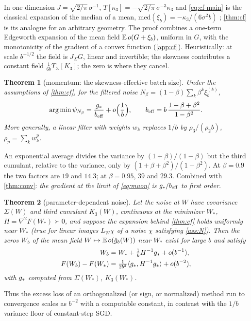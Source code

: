 \documentclass{article}
\theoremstyle{plain}
\newtheorem{theorem}{Theorem}
\theoremstyle{definition}
\theoremstyle{remark}
\begin{document}
In one dimension $J=\sqrt{2/\pi}\,\sigma^{-1}$, $T[\kappa_3]=-\sqrt{2/\pi}\,\sigma^{-3}\kappa_3$ and
\eqref{eq:cf-main} is the classical expansion of the median of a mean, $\mathrm{med}(\xi_b)=-\kappa_3/(6\sigma^2b)$
\citep{cornish1938moments}; \cref{thm:cf} is its analogue for an arbitrary geometry. The proof combines a one-term
Edgeworth expansion of the mean field $\mathbb{E}\,o(G+\xi_b)$, uniform in $G$, with the monotonicity of the gradient of a
convex function (\cref{app:cf}). Heuristically: at scale $b^{-1/2}$ the field is $J_\Sigma G$, linear and
invertible; the skewness contributes a constant field $\frac1{6b}T_\Sigma[K_3]$; the zero is where they cancel.

\begin{theorem}[momentum: the skewness-effective batch size]\label{thm:beff}
Under the assumptions of \cref{thm:cf}, for the filtered noise $N_\beta=(1-\beta)\sum_k\beta^k\xi_b^{(k)}$,
\[
\arg\min\psi_{N_\beta}=\frac{g_\ast}{b_{\mathrm{eff}}}+o\Big(\frac1b\Big),\qquad b_{\mathrm{eff}}=b\,\frac{1+\beta+\beta^2}{1-\beta^2}.
\]
More generally, a linear filter with weights $w_k$ replaces $1/b$ by $\rho_3/(\rho_2b)$, $\rho_p=\sum_kw_k^p$.
\end{theorem}

An exponential average divides the variance by $(1+\beta)/(1-\beta)$ but the third cumulant, relative to the
variance, only by $(1+\beta+\beta^2)/(1-\beta^2)$. At $\beta=0.9$ the two factors are $19$ and $14.3$; at
$\beta=0.95$, $39$ and $29.3$. Combined with \cref{thm:conv}: \emph{the gradient at the limit of \eqref{eq:muon} is
$g_\ast/b_{\mathrm{eff}}$ to first order.}

\begin{theorem}[parameter-dependent noise]\label{thm:state}
Let the noise at $W$ have covariance $\Sigma(W)$ and third cumulant $K_3(W)$, continuous at the minimizer $W_\ast$,
$H=\nabla^2F(W_\ast)\succ0$, and suppose the expansion behind \cref{thm:cf} holds uniformly near $W_\ast$ (true for
linear images $L_W\chi$ of a noise $\chi$ satisfying \cref{ass:N}). Then the zeros $W_b$ of the mean field
$W\mapsto\mathbb{E}\,o(\hat g_b(W))$ near $W_\ast$ exist for large $b$ and satisfy
\begin{align*}
W_b&=W_\ast+\tfrac1b H^{-1}g_\ast+o(b^{-1}),\\
F(W_b)-F(W_\ast)&=\tfrac1{2b^2}\langle g_\ast, H^{-1}g_\ast\rangle+o(b^{-2}),
\end{align*}
with $g_\ast$ computed from $\Sigma(W_\ast)$, $K_3(W_\ast)$.
\end{theorem}

Thus the excess loss of an orthogonalized (or sign, or normalized) method run to convergence scales as $b^{-2}$ with
a computable constant, in contrast with the $1/b$ variance floor of constant-step SGD.
\end{document}
